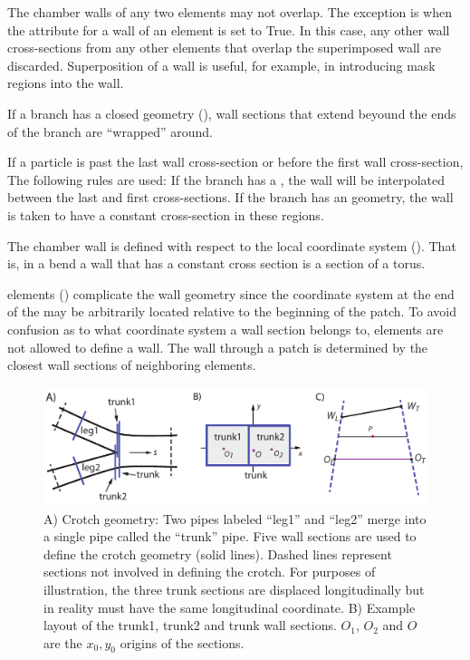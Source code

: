 The chamber walls of any two elements may not overlap. The exception
is when the  attribute for a wall of an element is set
to True. In this case, any other wall cross-sections from any other
elements that overlap the superimposed wall are discarded.
Superposition of a wall is useful, for example, in introducing mask
regions into the wall.

If a branch has a closed geometry (), wall sections that
extend beyound the ends of the branch are ``wrapped'' around.

If a particle is past the last wall cross-section or before the first
wall cross-section, The following rules are used: If the branch has a
, the wall will be interpolated between the last
and first cross-sections. If the branch has an  geometry, the
wall is taken to have a constant cross-section in these regions. 

The chamber wall is defined with respect to the local coordinate
system (). That is, in a bend a wall that has a constant
cross section is a section of a torus.

 elements () complicate the wall geometry
since the coordinate system at the end of the  may be
arbitrarily located relative to the beginning of the patch. To avoid
confusion as to what coordinate system a wall section belongs to,
 elements are not allowed to define a wall. The wall through
a patch is determined by the closest wall sections of neighboring
elements.


\begin{figure}[tb]
  \centering
  \includegraphics[width=6in]{crotch.pdf}
  \caption[vacuum chamber crotch geometry.]
{A) Crotch geometry: Two pipes labeled ``leg1'' and ``leg2'' merge
into a single pipe called the ``trunk'' pipe. Five wall sections are
used to define the crotch geometry (solid lines). Dashed lines
represent sections not involved in defining the crotch. For purposes
of illustration, the three trunk sections are displaced longitudinally
but in reality must have the same longitudinal coordinate.  B) Example
layout of the trunk1, trunk2 and trunk wall sections. $O_1$, $O_2$
and $O$ are the $x_0, y_0$ origins of the sections.}
  \label{f:crotch}
\end{figure}

